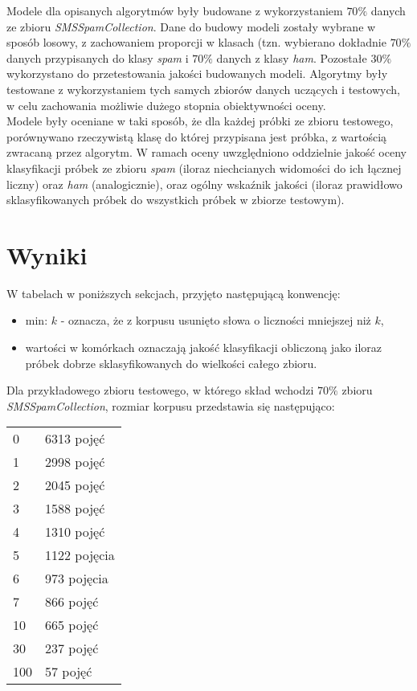 \documentclass[a4paper,12pt]{article}
\begin{document}
Modele dla opisanych algorytmów były budowane z wykorzystaniem $70\%$ danych ze zbioru \textit{SMSSpamCollection}. Dane do budowy modeli zostały
wybrane w sposób losowy, z zachowaniem proporcji w klasach (tzn. wybierano dokładnie $70\%$ danych przypisanych do klasy \textit{spam} i $70\%$ 
danych z klasy \textit{ham}. Pozostałe $30\%$ wykorzystano do przetestowania jakości budowanych modeli. Algorytmy były testowane z wykorzystaniem
tych samych zbiorów danych uczących i testowych, w celu zachowania możliwie dużego stopnia obiektywności oceny.\\

Modele były oceniane w taki sposób, że dla każdej próbki ze zbioru testowego, porównywano rzeczywistą klasę do której przypisana jest próbka, z
wartością zwracaną przez algorytm. W ramach oceny uwzględniono oddzielnie jakość oceny klasyfikacji próbek ze zbioru \textit{spam} (iloraz niechcianych widomości do ich łącznej liczny) oraz \textit{ham} (analogicznie), oraz ogólny wskaźnik jakości (iloraz prawidłowo sklasyfikowanych próbek do wszystkich próbek w zbiorze testowym).

\section{Wyniki}

W tabelach w poniższych sekcjach, przyjęto następującą konwencję:\\

\begin{itemize}
\item min: $k$ - oznacza, że z korpusu usunięto słowa o liczności mniejszej niż $k$,
\item wartości w komórkach oznaczają jakość klasyfikacji obliczoną jako iloraz próbek dobrze sklasyfikowanych do wielkości całego zbioru.
\end{itemize}

Dla przykładowego zbioru testowego, w którego skład wchodzi $70\%$ zbioru \textit{SMSSpamCollection},
rozmiar korpusu przedstawia się następująco:\\

\begin{tabular}{l | l}
0 & 6313 pojęć \\
1 & 2998 pojęć \\
2 & 2045 pojęć \\
3 & 1588 pojęć \\
4 & 1310 pojęć \\
5 & 1122 pojęcia \\
6 & 973 pojęcia \\
7 & 866 pojęć \\
10  & 665 pojęć \\
30  & 237 pojęć \\
100 & 57 pojęć \\
\end{tabular}
\\
\end{document}
